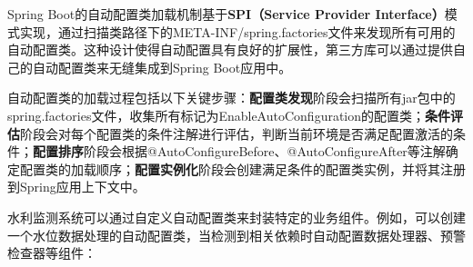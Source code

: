 Spring Boot的自动配置类加载机制基于\textbf{SPI（Service Provider Interface）}模式实现，通过扫描类路径下的META-INF/spring.factories文件来发现所有可用的自动配置类。这种设计使得自动配置具有良好的扩展性，第三方库可以通过提供自己的自动配置类来无缝集成到Spring Boot应用中。

自动配置类的加载过程包括以下关键步骤：\textbf{配置类发现}阶段会扫描所有jar包中的spring.factories文件，收集所有标记为EnableAutoConfiguration的配置类；\textbf{条件评估}阶段会对每个配置类的条件注解进行评估，判断当前环境是否满足配置激活的条件；\textbf{配置排序}阶段会根据@AutoConfigureBefore、@AutoConfigureAfter等注解确定配置类的加载顺序；\textbf{配置实例化}阶段会创建满足条件的配置类实例，并将其注册到Spring应用上下文中。

水利监测系统可以通过自定义自动配置类来封装特定的业务组件。例如，可以创建一个水位数据处理的自动配置类，当检测到相关依赖时自动配置数据处理器、预警检查器等组件：


